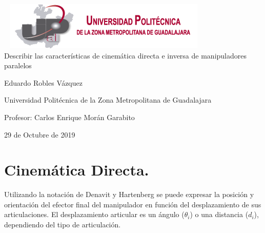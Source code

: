 \documentclass[11pt,a4paper,oldfontcommands,oneside]{memoir}
\begin{document}
%
%
\thispagestyle{empty}

{%
\sffamily
\centering
\Large

~\vspace{\fill}
\includegraphics[scale=1]{logo1.png} \\
{\huge 
\vspace{4cm}
Describir las características de cinemática directa e inversa de manipuladores paralelos
}
\vspace{2.5cm}

{\LARGE
Eduardo Robles Vázquez
}

\vspace{2.5cm}

Universidad Politécnica de la Zona Metropolitana de Guadalajara

\vspace{3.5cm}

Profesor: Carlos Enrique Morán Garabito

\vspace{\fill}

29 de Octubre de 2019

}%

\vspace{.5cm}
\hfill\break




\tableofcontents*

\clearpage


\chapter{Cinemática Directa.}

Utilizando la notación de Denavit y Hartenberg se puede expresar la posición y orientación del efector final del manipulador en función del desplazamiento de sus articulaciones. El desplazamiento articular es un ángulo ($\theta_i$) o una distancia ($d_i$), dependiendo del tipo de articulación.
\end{document}
